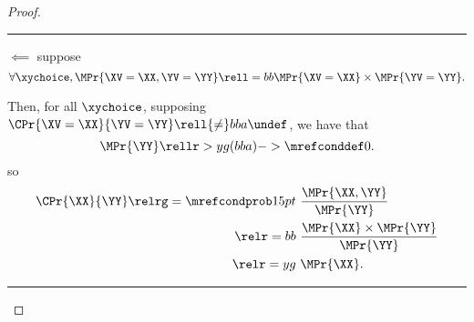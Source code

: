 \begin{proof}
  \hrule
  $\impliedby$ suppose 
  $$\forall \xychoice,
  \MPr{\XV = \XX, \YV = \YY} \rell = bb
  \MPr{\XV = \XX}
  \times
  \MPr{\YV = \YY}.$$

  Then, for all $\xychoice$, supposing $\CPr{\XV = \XX}{\YV = \YY} \rell {\ne} bba \undef$, we have that
  $$\MPr{\YY} \rellr > yg {(bba)->\mrefconddef} 0.$$
  so
  \begin{align*}
    \CPr{\XX}{\YY}
    \relrg = {\mrefcondprob} 15pt \ & 
    \frac{\MPr{\XX, \YY}}{\MPr{\YY}}
    \\
    \relr = bb \ & \frac{\MPr{\XX} \times \MPr{\YY}}{\MPr{\YY}}\\
    \relr = yg \ & \MPr{\XX}.
  \end{align*}
  \hrule
\end{proof}
